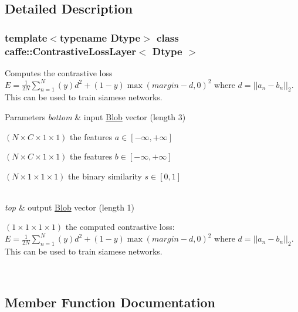 \subsection{Detailed Description}
\subsubsection*{template$<$typename Dtype$>$\newline
class caffe\+::\+Contrastive\+Loss\+Layer$<$ Dtype $>$}

Computes the contrastive loss $ E = \frac{1}{2N} \sum\limits_{n=1}^N \left(y\right) d^2 + \left(1-y\right) \max \left(margin-d, 0\right)^2 $ where $ d = \left| \left| a_n - b_n \right| \right|_2 $. This can be used to train siamese networks. 


\begin{DoxyParams}{Parameters}
{\em bottom} & input \mbox{\hyperlink{classcaffe_1_1_blob}{Blob}} vector (length 3)
\begin{DoxyEnumerate}
\item $ (N \times C \times 1 \times 1) $ the features $ a \in [-\infty, +\infty]$
\item $ (N \times C \times 1 \times 1) $ the features $ b \in [-\infty, +\infty]$
\item $ (N \times 1 \times 1 \times 1) $ the binary similarity $ s \in [0, 1]$ 
\end{DoxyEnumerate}\\
\hline
{\em top} & output \mbox{\hyperlink{classcaffe_1_1_blob}{Blob}} vector (length 1)
\begin{DoxyEnumerate}
\item $ (1 \times 1 \times 1 \times 1) $ the computed contrastive loss\+: $ E = \frac{1}{2N} \sum\limits_{n=1}^N \left(y\right) d^2 + \left(1-y\right) \max \left(margin-d, 0\right)^2 $ where $ d = \left| \left| a_n - b_n \right| \right|_2 $. This can be used to train siamese networks. 
\end{DoxyEnumerate}\\
\hline
\end{DoxyParams}


\subsection{Member Function Documentation}
\mbox{\label{classcaffe_1_1_contrastive_loss_layer_af0f16d5119ac6118b670c1966c38fd7d}} 
